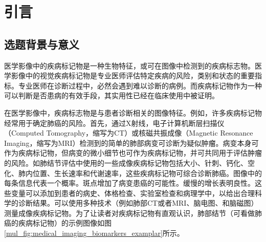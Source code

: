 \chapter{引言}\label{cha:introduction}
\section{选题背景与意义}
\label{sec:background}
医学影像中的疾病标记物是一种生物特征，或可在图像中检测到的疾病标志物。医学影像中的视觉疾病标记物是专业医师评估特定疾病的风险，类别和状态的重要指标。专业医师在诊断过程中，必然会遇到难以诊断的病例。而疾病标记物作为一种可以判断是否患病的有效手段，其实用性已经在临床使用中被证明。

在医学影像中，疾病标志物是与患者诊断相关的图像特征。例如，许多疾病标记物经常用于确定肺癌的风险。首先，通过X射线，电子计算机断层扫描仪（Computed Tomography，缩写为CT）或核磁共振成像（Magnetic Resonance Imaging，缩写为MRI）检测到的简单的肺部病变可诊断为疑似肿瘤。病变本身可作为疾病标记物，但病变的微小细节也可作为疾病标记物，并可共同用于评估肿瘤的风险。如肺结节评估中使用的一些成像疾病标记物包括大小、针刺、钙化、空化、肺内位置、生长速率和代谢速率，这些疾病标记物可综合诊断肺癌。图像中的每条信息代表一个概率。斑点增加了病变患癌的可能性。缓慢的增长表明良性。这些变量可以添加到患者的病史、体格检查、实验室检查和病理学中，以给出合理科学的诊断结果。可以使用多种技术（例如肺部CT或者MRI、脑电图、和脑磁图）测量成像疾病标记物。为了让读者对疾病标记物有直观认识，肺部结节（可看做肺癌的疾病标记物）的示例图像如图\ref{mul_fig:medical_imaging_biomarkers_examplar}所示。

